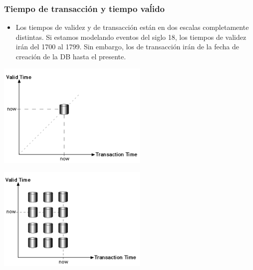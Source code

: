 \begin{frame}
\frametitle{Tiempo de transacción y tiempo vaĺido}
	\begin{itemize}
	\item	Los tiempos de validez y de transacción están en dos escalas
		completamente distintas. \pause
		Si estamos modelando eventos del siglo 18, los tiempos de validez
		irán del 1700 al 1799. \pause
		Sin embargo, los de transacción irán de la fecha de creación
		de la DB hasta el presente.
	\end{itemize}
\end{frame}

\begin{frame}
	\begin{center}
	\includegraphics[height=5cm]{snapshot.png}
	\end{center}
\end{frame}

\begin{frame}
	\begin{center}
	\includegraphics[height=5cm]{bitemporal.png}
	\end{center}
\end{frame}

